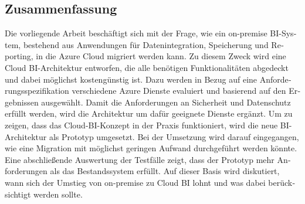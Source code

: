 \begin{otherlanguage}{ngerman}
	\chapter*{Zusammenfassung}
Die vorliegende Arbeit beschäftigt sich mit der Frage, wie ein on-premise BI-System, bestehend aus Anwendungen für Datenintegration, Speicherung und Reporting, in die Azure Cloud migriert werden kann. Zu diesem Zweck wird eine Cloud BI-Architektur entworfen, die alle benötigen Funktionalitäten abgedeckt und dabei möglichst kostengünstig ist. Dazu werden in Bezug auf eine Anforderungsspezifikation verschiedene Azure Dienste evaluiert und basierend auf den Ergebnissen ausgewählt. Damit die Anforderungen an Sicherheit und Datenschutz erfüllt werden, wird die Architektur um dafür geeignete Dienste ergänzt.
Um zu zeigen, dass das Cloud-BI-Konzept in der Praxis funktioniert, wird die neue BI-Architektur als Prototyp umgesetzt. Bei der Umsetzung wird darauf eingegangen, wie eine Migration mit möglichst geringen Aufwand durchgeführt werden könnte. Eine abschließende Auswertung der Testfälle zeigt, dass der Prototyp mehr Anforderungen als das Bestandssystem erfüllt. Auf dieser Basis wird diskutiert, wann sich der Umstieg von on-premise zu Cloud BI lohnt und was dabei berücksichtigt werden sollte.
\end{otherlanguage}